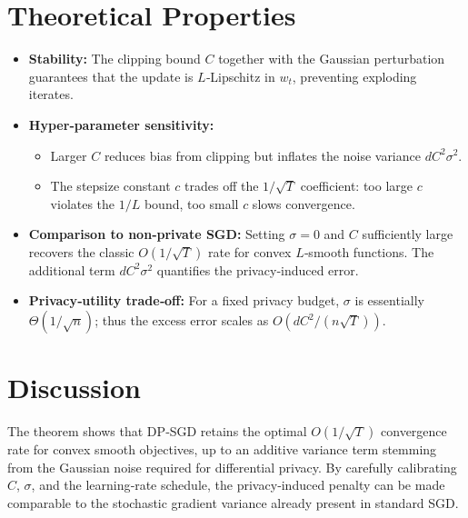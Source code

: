 \documentclass[11pt]{article}
\begin{document}
\section*{Theoretical Properties}
\begin{itemize}
\item \textbf{Stability:} The clipping bound $C$ together with the Gaussian perturbation guarantees that the update is $L$‑Lipschitz in $w_t$, preventing exploding iterates.
\item \textbf{Hyper‑parameter sensitivity:}
  \begin{itemize}
  \item Larger $C$ reduces bias from clipping but inflates the noise variance $dC^{2}\sigma^{2}$.
  \item The stepsize constant $c$ trades off the $1/\sqrt{T}$ coefficient: too large $c$ violates the $1/L$ bound, too small $c$ slows convergence.
  \end{itemize}
\item \textbf{Comparison to non‑private SGD:} Setting $\sigma=0$ and $C$ sufficiently large recovers the classic $O(1/\sqrt{T})$ rate for convex $L$‑smooth functions. The additional term $dC^{2}\sigma^{2}$ quantifies the privacy‑induced error.
\item \textbf{Privacy‑utility trade‑off:} For a fixed privacy budget, $\sigma$ is essentially $\Theta(1/\sqrt{n})$; thus the excess error scales as $O(dC^{2}/(n\sqrt{T}))$.
\end{itemize}

\section*{Discussion}
The theorem shows that DP‑SGD retains the optimal $O(1/\sqrt{T})$ convergence rate for convex smooth objectives, up to an additive variance term stemming from the Gaussian noise required for differential privacy. By carefully calibrating $C$, $\sigma$, and the learning‑rate schedule, the privacy‑induced penalty can be made comparable to the stochastic gradient variance already present in standard SGD.

\newpage
\end{document}
